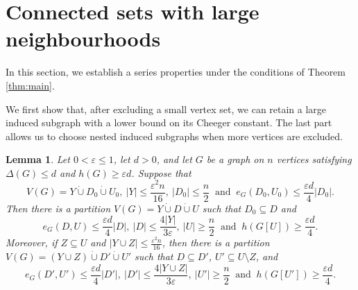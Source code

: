 \documentclass[11pt,a4paper]{article}
\newtheorem{lemma}[theorem]{Lemma}
\theoremstyle{definition}
\theoremstyle{remark}
\newcommand{\eps}{\varepsilon}
\begin{document}
\section{Connected sets with large neighbourhoods}\label{sec:construction}

In this section, we establish a series properties  under the conditions of Theorem \ref{thm:main}.

We first show that, after excluding a small vertex set, we can retain a large induced subgraph with a lower bound on its Cheeger constant. The last part allows us to choose nested induced subgraphs when more vertices are excluded.

\begin{lemma}\label{lem:remainder}
Let $0<\eps\le1$, let $d>0$, and let $G$ be a graph on $n$ vertices
satisfying $\Delta(G)\le d$ and $h(G)\ge\eps d$. Suppose that
\[
 V(G)=Y\mathbin{\dot\cup}D_0\mathbin{\dot\cup}U_0,
 \ |Y|\le\frac{\eps^2n}{16},
 \ |D_0|\le\frac{n}{2}
 \  \text{ and }\ e_G(D_0,U_0)\le\frac{\eps d}{4}|D_0|.
\]
Then there is a partition
$V(G)=Y\mathbin{\dot\cup}D\mathbin{\dot\cup}U$ such that
$D_0\subseteq D$ and
\[
 e_G(D,U)\le\frac{\eps d}{4}|D|,
 \ |D|\le\frac{4|Y|}{3\eps},
 \ |U|\ge\frac{n}{2}
 \ \text{ and } \  h(G[U])\ge\frac{\eps d}{4}.
\]
Moreover, if $Z\subseteq U$ and
$|Y\cup Z|\le\frac{\eps^2n}{16}$, then there is a partition
$
 V(G)=(Y\cup Z)\mathbin{\dot\cup}D'\mathbin{\dot\cup}U'
$
such that $D\subseteq D'$, $U'\subseteq U\setminus Z$, and
\[
 e_G(D',U')\le\frac{\eps d}{4}|D'|,
 \ |D'|\le\frac{4|Y\cup Z|}{3\eps},
 \ |U'|\ge\frac{n}{2}
 \ \text{ and }\  h(G[U'])\ge\frac{\eps d}{4}.
\]
\end{lemma}
\end{document}
